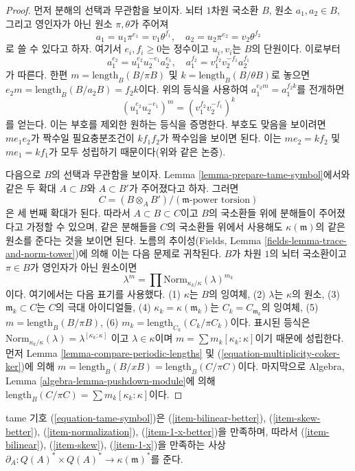 \begin{proof}
먼저 분해의 선택과 무관함을 보이자. 뇌터 $1$차원 국소환 $B$, 원소
$a_1, a_2 \in B$, 그리고 영인자가 아닌 원소 $\pi, \theta$가 주어져
$$
a_1 = u_1 \pi^{e_1} = v_1 \theta^{f_1},\quad
a_2 = u_2 \pi^{e_2} = v_2 \theta^{f_2}
$$
로 쓸 수 있다고 하자. 여기서 $e_i, f_i \geq 0$는 정수이고
$u_i, v_i$는 $B$의 단원이다. 이로부터
$$
a_1^{e_2} = u_1^{e_2}u_2^{-e_1}a_2^{e_1},\quad
a_1^{f_2} = v_1^{f_2}v_2^{-f_1}a_2^{f_1}
$$
가 따른다. 한편
$m = \text{length}_B(B/\pi B)$ 및 $k = \text{length}_B(B/\theta B)$로
놓으면 $e_2 m = \text{length}_B(B/a_2 B) = f_2 k$이다. 위의 등식을
사용하여 $a_1^{e_2m} = a_1^{f_2 k}$를 전개하면
$$
(u_1^{e_2}u_2^{-e_1})^m =  (v_1^{f_2}v_2^{-f_1})^k
$$
를 얻는다. 이는 부호를 제외한 원하는 등식을 증명한다. 부호도 맞음을
보이려면 $me_1e_2$가 짝수일 필요충분조건이 $kf_1f_2$가 짝수임을
보이면 된다. 이는 $me_2 = kf_2$ 및 $me_1 = kf_1$가 모두 성립하기
때문이다(위와 같은 논증).

\medskip\noindent
다음으로 $B$의 선택과 무관함을 보이자. Lemma
\ref{lemma-prepare-tame-symbol}에서와 같은 두 확대 $A \subset B$와
$A \subset B'$가 주어졌다고 하자. 그러면
$$
C = (B \otimes_A B')/(\mathfrak m\text{-power torsion})
$$
은 세 번째 확대가 된다. 따라서 $A \subset B \subset C$이고 $B$의
국소환들 위에 분해들이 주어졌다고 가정할 수 있으며, 같은 분해들을
$C$의 국소환들 위에서 사용해도 $\kappa(\mathfrak m)$의 같은 원소를
준다는 것을 보이면 된다. 노름의 추이성(Fields, Lemma
\ref{fields-lemma-trace-and-norm-tower})에 의해 이는 다음 문제로
귀착된다. $B$가 차원 $1$의 뇌터 국소환이고 $\pi \in B$가 영인자가
아닌 원소이면
$$
\lambda^m = \prod \text{Norm}_{\kappa_k/\kappa}(\lambda)^{m_k}
$$
이다. 여기에서는 다음 표기를 사용했다. (1) $\kappa$는 $B$의 잉여체,
(2) $\lambda$는 $\kappa$의 원소, (3) $\mathfrak m_k \subset C$는 $C$의
극대 아이디얼들, (4) $\kappa_k = \kappa(\mathfrak m_k)$는
$C_k = C_{\mathfrak m_k}$의 잉여체, (5)
$m = \text{length}_B(B/\pi B)$, (6)
$m_k = \text{length}_{C_k}(C_k/\pi C_k)$이다. 표시된 등식은
$\text{Norm}_{\kappa_k/\kappa}(\lambda) = \lambda^{[\kappa_k : \kappa]}$
이고 $\lambda \in \kappa$이며
$m = \sum m_k[\kappa_k:\kappa]$이기 때문에 성립한다. 먼저 Lemma
\ref{lemma-compare-periodic-lengths} 
및 (\ref{equation-multiplicity-coker-ker})에 의해
$m = \text{length}_B(B/xB) = \text{length}_B(C/\pi C)$이다. 마지막으로
Algebra, Lemma \ref{algebra-lemma-pushdown-module}에 의해
$\text{length}_B(C/\pi C) = \sum m_k[\kappa_k:\kappa]$이다.
\end{proof}
\begin{lemma}
\label{lemma-tame-symbol}
tame 기호 (\ref{equation-tame-symbol})은
(\ref{item-bilinear-better}), (\ref{item-skew-better}),
(\ref{item-normalization}), (\ref{item-1-x-better})을 만족하며, 따라서
(\ref{item-bilinear}), (\ref{item-skew}), (\ref{item-1-x})을 만족하는 사상
$\partial_A : Q(A)^* \times Q(A)^* \to \kappa(\mathfrak m)^*$를 준다.
\end{lemma}

